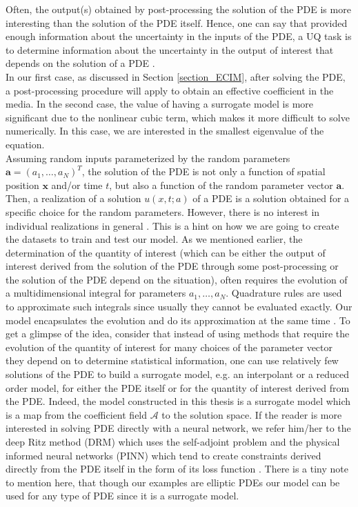 Often, the output(s) obtained by post-processing the solution of the PDE is more interesting than the solution of the PDE itself. Hence, one can say that provided enough information about the uncertainty in the inputs of the PDE, a UQ task is to determine information about the uncertainty in the output of interest that depends on the solution of a PDE \cite{UQIntroGunzburger}.\\
In our first case, as discussed in Section \eqref{section_ECIM}, after solving the PDE, a post-processing procedure will apply to obtain an effective coefficient in the media. In the second case, the value of having a surrogate model is more significant due to the nonlinear cubic term, which makes it more difficult to solve numerically. In this case, we are interested in the smallest eigenvalue of the equation.\\
Assuming random inputs parameterized by the random parameters $\bm{a} = (a_1,\dots,a_N)^T$, the solution of the PDE is not only a function of spatial position $\bm{x}$ and/or time $t$, but also a function of the random parameter vector $\bm{a}$. Then, a realization of a solution $u(x,t; a)$ of a PDE is a solution obtained for a specific choice for the random parameters. However, there is no interest in individual realizations in general \cite{UQIntroGunzburger}. This is a hint on how we are going to create the datasets to train and test our model. As we mentioned earlier, the determination of the quantity of interest (which can be either the output of interest derived from the solution of the PDE through some post-processing or the solution of the PDE depend on the situation), often requires the evolution of a multidimensional integral for parameters $a_1,\dots,a_N$. Quadrature rules are used to approximate such integrals since usually they cannot be evaluated exactly. Our model encapsulates the evolution and do its approximation at the same time \cite{UQIntroGunzburger}. To get a glimpse of the idea, consider that instead of using methods that require the evolution of the quantity of interest for many choices of the parameter vector they depend on to determine statistical information, one can use relatively few solutions of the PDE to build a surrogate model, e.g. an interpolant or a reduced order model, for either the PDE itself or for the quantity of interest derived from the PDE. Indeed, the model constructed in this thesis is a surrogate model which is a map from the coefficient field $\mathscr{A}$ to the solution space. If the reader is more interested in solving PDE directly with a neural network, we refer him/her to the deep Ritz method (DRM) which uses the self-adjoint problem \cite{weinan2018deep} and the physical informed neural networks (PINN) which tend to create constraints derived directly from the PDE itself in the form of its loss function \cite{raissi2017physics,raissi2018deep}.
There is a tiny note to mention here, that though our examples are elliptic PDEs our model can be used for any type of PDE since it is a surrogate model.
